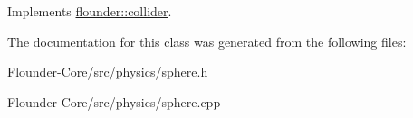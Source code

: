 Implements \hyperlink{classflounder_1_1collider_ae185e877868e8783e28e8d74120f2f2b}{flounder\+::collider}.



The documentation for this class was generated from the following files\+:\begin{DoxyCompactItemize}
\item 
Flounder-\/\+Core/src/physics/sphere.\+h\item 
Flounder-\/\+Core/src/physics/sphere.\+cpp\end{DoxyCompactItemize}
